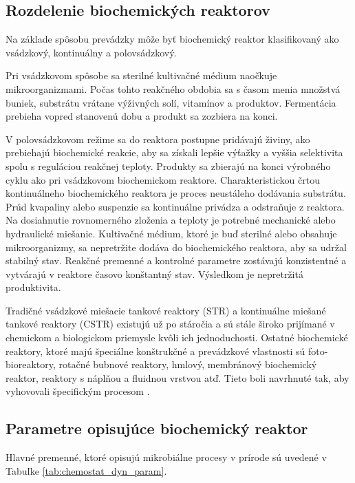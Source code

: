 \subsection{Rozdelenie biochemických reaktorov}
Na základe spôsobu prevádzky môže byť biochemický reaktor klasifikovaný ako vsádzkový, kontinuálny a polovsádzkový.
 
Pri vsádzkovom spôsobe sa sterilné kultivačné médium naočkuje mikroorganizmami. Počas tohto reakčného obdobia sa s časom menia množstvá buniek, substrátu vrátane výživných solí, vitamínov a produktov. Fermentácia prebieha vopred stanovenú dobu a produkt sa zozbiera na konci.

V polovsádzkovom režime sa do reaktora postupne pridávajú živiny, ako prebiehajú biochemické reakcie, aby sa získali lepšie výťažky a vyššia selektivita spolu s reguláciou reakčnej teploty. Produkty sa zbierajú na konci výrobného cyklu ako pri vsádzkovom biochemickom reaktore. Charakteristickou črtou kontinuálneho biochemického reaktora je proces neustáleho dodávania substrátu. Prúd kvapaliny alebo suspenzie sa kontinuálne privádza a odstraňuje z reaktora. Na dosiahnutie rovnomerného zloženia a teploty je potrebné mechanické alebo hydraulické miešanie. Kultivačné médium, ktoré je buď sterilné alebo obsahuje mikroorganizmy, sa nepretržite dodáva do biochemického reaktora, aby sa udržal stabilný stav. Reakčné premenné a
kontrolné parametre zostávajú konzistentné a vytvárajú v reaktore časovo konštantný stav. Výsledkom je nepretržitá produktivita.

Tradičné vsádzkové miešacie tankové reaktory (STR) a kontinuálne miešané tankové reaktory (CSTR) existujú už po
stáročia a sú stále široko prijímané v chemickom a biologickom priemysle kvôli ich jednoduchosti. Ostatné biochemické reaktory, ktoré majú špeciálne konštrukčné a prevádzkové vlastnosti sú foto-bioreaktory, rotačné bubnové reaktory, hmlový, membránový biochemický reaktor, reaktory s náplňou a fluidnou vrstvou atď. Tieto boli navrhnuté tak, aby vyhovovali špecifickým procesom \cite{kaushik:bioreactors:2014}.

\subsection{Parametre opisujúce biochemický reaktor}
Hlavné premenné, ktoré opisujú mikrobiálne procesy v prírode sú uvedené v Tabuľke \ref{tab:chemostat_dyn_param}.

